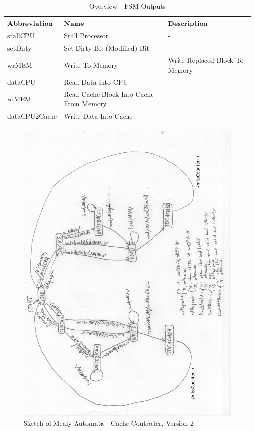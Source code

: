 \begin{table}
	\caption{Overview - FSM Outputs}
	\label{tab:tableFSMOutputs}
	\begin{tabular}{lll}
	\hline %
	Abbreviation & Name & Description \\
	\hline %
	stallCPU		& Stall Processor				& - \\
	setDirty		& Set Dirty Bit (Modified) Bit 	& - \\
	wrMEM			& Write To Memory				& Write Replaced Block To Memory \\
	dataCPU			& Read Data Into CPU			& - \\
	rdMEM			& Read Cache Block Into Cache From Memory & - \\
	dataCPU2Cache	& Write Data Into Cache			& - \\
	\hline %
	\end{tabular}
\end{table}

\newpage
\begin{landscape}
\begin{figure}
	\centering
	\includegraphics[scale=.8]{pictures/sketch_mealyAutomata_v2_modified}
	\caption{Sketch of Mealy Automata - Cache Controller, Version 2}
	\label{fig:sketchMealyAutomata}
\end{figure}
\end{landscape}